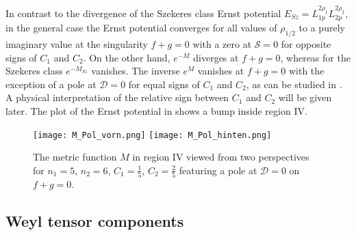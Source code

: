 \documentclass[12pt]{iopart}
\begin{document}
In contrast to the divergence of the Szekeres class Ernst potential $E_{Sz}=L_{1p}^{2\rho_1}L_{2p}^{2\rho_2}$, in the general case the Ernst potential converges for all values of $\rho_{1/2}$ to a purely imaginary value at the singularity $f+g=0$ with a zero at $\mathcal{S}=0$ for opposite signs of $C_1$ and $C_2$. On the other hand, $e^{-M}$ diverges at $f+g=0$, whereas for the Szekeres class $e^{-M_{Sz}}$ vanishes. The inverse $e^{M}$ vanishes at $f+g=0$ with the exception of a pole at $\mathcal{D}=0$ for equal signs of $C_1$ and $C_2$, as can be studied in . A physical interpretation of the relative sign between $C_1$ and $C_2$ will be given later. The plot of the Ernst potential in  shows a bump inside region IV.
%
\begin{figure}[ht]
\centering
\texttt{[image: M\_Pol\_vorn.png]}\qquad
\texttt{[image: M\_Pol\_hinten.png]}
\caption{The metric function $M$ in region IV viewed from two perspectives for $n_1=5$, $n_2=6$, $C_1=\frac15$, $C_2=\frac25$ featuring a pole at $\mathcal{D}=0$ on $f+g=0$.}
\label{fig:M}
\end{figure} 
%

\subsection{Weyl tensor components}
\end{document}
